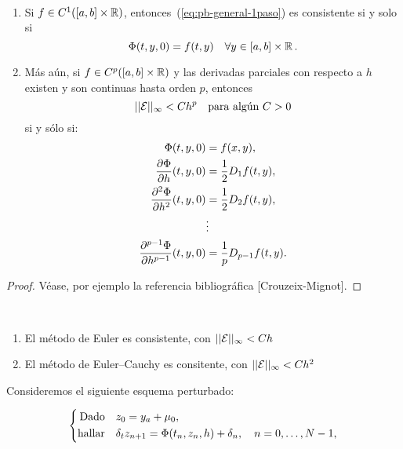 \begin{theorem}[Consistencia]~
  \label{thm:consitencia-pb-general-1paso}
  \begin{enumerate}
  \item Si $f\in C^1([a,b]\times\operatorname{{\mathbb R}})$,
    entonces~(\ref{eq:pb-general-1paso}) es consistente si y solo si 
    \begin{equation*}
      \Phi(t,y,0) = f(t,y)\quad \forall y\in[a,b]\times\operatorname{{\mathbb R}}.
    \end{equation*}
  \item Más aún, si $f\in C^p([a,b]\times\operatorname{{\mathbb R}})$ y las derivadas
    parciales con respecto a $h$ existen y son continuas hasta orden
    $p$, entonces
    $$ ||{\cal E}||_\infty<C h^p \quad \text{para algún $C>0$}$$
    si y sólo si:
    \begin{align*}
      \Phi(t,y,0) &= f(x,y), \\
      \frac{\partial\Phi}{\partial h}(t,y,0) &=
      \frac{1}{2}D_{1}f(t,y),
      \\
      \frac{\partial^2\Phi}{\partial h^2}(t,y,0) &=
      \frac{1}{2}D_{2}f(t,y),
      \\
      &\vdots
      \\
      \frac{\partial^{p-1}\Phi}{\partial h^{p-1}}(t,y,0) &=
      \frac{1}{p} D_{p-1}f(t,y).
    \end{align*}
  \end{enumerate}
\end{theorem}

\begin{proof}
  Véase, por ejemplo la referencia bibliográfica
  [Crouzeix-Mignot].
\end{proof}

\begin{example}~
  \begin{enumerate}
  \item 
    El método de Euler es consistente, con  $ ||{\cal E}||_\infty<C h $
  \item El método de Euler--Cauchy es consitente, con $ ||{\cal
      E}||_\infty<C h^2 $
  \end{enumerate}
\end{example}

Consideremos el siguiente esquema perturbado:

\begin{equation}
  \label{eq:pb-perturbado-general-1paso} 
  \left\{
  \begin{aligned}
    \text{Dado}\quad &z_0 = {y_a}+\mu_0,\\
    \text{hallar}\quad &\delta_t z_{n+1} = \Phi({t_n},z_n, h) + \delta_n, \quad
    n=0,\dots, N-1,
  \end{aligned}
  \right.
\end{equation}

